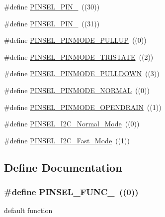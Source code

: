 \begin{DoxyCompactItemize}
\item 
\#define \hyperlink{group___p_i_n_s_e_l___public___macros_ga8b7430cef75c76e4824a34093cb037c6}{\-P\-I\-N\-S\-E\-L\-\_\-\-P\-I\-N\-\_}~((30))
\item 
\#define \hyperlink{group___p_i_n_s_e_l___public___macros_ga07d3d7517dd2653ef8d0644a353f1101}{\-P\-I\-N\-S\-E\-L\-\_\-\-P\-I\-N\-\_}~((31))
\item 
\#define \hyperlink{group___p_i_n_s_e_l___public___macros_ga2a9e1ebf0d763e08959c69866272532e}{\-P\-I\-N\-S\-E\-L\-\_\-\-P\-I\-N\-M\-O\-D\-E\-\_\-\-P\-U\-L\-L\-U\-P}~((0))
\item 
\#define \hyperlink{group___p_i_n_s_e_l___public___macros_ga6777cc9af3537a1a29dd1a577993851f}{\-P\-I\-N\-S\-E\-L\-\_\-\-P\-I\-N\-M\-O\-D\-E\-\_\-\-T\-R\-I\-S\-T\-A\-T\-E}~((2))
\item 
\#define \hyperlink{group___p_i_n_s_e_l___public___macros_ga5d6ee82664e7bf5c016f748f05931061}{\-P\-I\-N\-S\-E\-L\-\_\-\-P\-I\-N\-M\-O\-D\-E\-\_\-\-P\-U\-L\-L\-D\-O\-W\-N}~((3))
\item 
\#define \hyperlink{group___p_i_n_s_e_l___public___macros_ga699b7086c454cbc6e279f7f7c7d25ee6}{\-P\-I\-N\-S\-E\-L\-\_\-\-P\-I\-N\-M\-O\-D\-E\-\_\-\-N\-O\-R\-M\-A\-L}~((0))
\item 
\#define \hyperlink{group___p_i_n_s_e_l___public___macros_ga11e5a84a23abfca37227c8b40f3f4161}{\-P\-I\-N\-S\-E\-L\-\_\-\-P\-I\-N\-M\-O\-D\-E\-\_\-\-O\-P\-E\-N\-D\-R\-A\-I\-N}~((1))
\item 
\#define \hyperlink{group___p_i_n_s_e_l___public___macros_ga9275d5f93ab8a39abbcc7a63f91c72d0}{\-P\-I\-N\-S\-E\-L\-\_\-\-I2\-C\-\_\-\-Normal\-\_\-\-Mode}~((0))
\item 
\#define \hyperlink{group___p_i_n_s_e_l___public___macros_ga741f812cde543d91c6c887518656a7aa}{\-P\-I\-N\-S\-E\-L\-\_\-\-I2\-C\-\_\-\-Fast\-\_\-\-Mode}~((1))
\end{DoxyCompactItemize}


\subsection{\-Define \-Documentation}
\hypertarget{group___p_i_n_s_e_l___public___macros_ga52e96a68181b78213b671c5fe8d60d33}{
\subsubsection[{\-P\-I\-N\-S\-E\-L\-\_\-\-F\-U\-N\-C\-\_\-0}]{\setlength{\rightskip}{0pt plus 5cm}\#define {\bf \-P\-I\-N\-S\-E\-L\-\_\-\-F\-U\-N\-C\-\_}~((0))}}\label{group___p_i_n_s_e_l___public___macros_ga52e96a68181b78213b671c5fe8d60d33}
default function 

